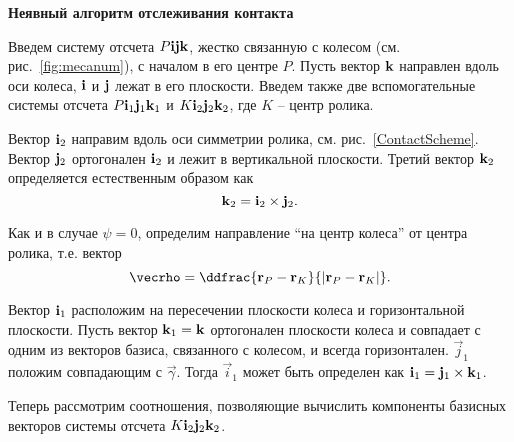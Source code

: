 \textbf{Неявный алгоритм отслеживания контакта}

Введем систему отсчета $P{\bf i}{\bf j}{\bf k}$, жестко связанную с колесом (см. рис.~\ref{fig:mecanum}), с началом в его центре $P$. Пусть вектор ${\bf k}$ направлен вдоль оси колеса, ${\bf i}$ и ${\bf j}$ лежат в его плоскости. Введем также две вспомогательные системы отсчета $P{\bf i}_1{\bf j}_1{\bf k}_1$ и $K{\bf i}_2{\bf j}_2{\bf k}_2$, где $K$ -- центр ролика.

Вектор ${\bf i}_2$ направим вдоль оси симметрии ролика, см. рис.~\ref{ContactScheme}. Вектор ${\bf j}_2$ ортогонален ${\bf i}_2$ и лежит в вертикальной плоскости. Третий вектор ${\bf k}_2$ определяется естественным образом как
$$
{\bf k}_2={\bf i}_2\times {\bf j}_2.
$$



Как и в случае $\psi = 0$, определим направление ``на центр колеса'' от центра ролика, т.е. вектор
$$
    \vecrho = \ddfrac
        { {\bf r}_{P}-{\bf r}_{K} }
        {\left| {\bf r}_{P}-{\bf r}_{K} \right|}.
$$

Вектор ${\bf i}_1$ расположим на пересечении плоскости колеса и горизонтальной плоскости. Пусть вектор ${\bf k}_1 = {\bf k}$ ортогонален плоскости колеса и совпадает с одним из векторов базиса, связанного с колесом, и всегда горизонтален. 
$\vec{j}_1$ положим совпадающим с $\vec{\gamma}$. Тогда $\vec{i}_1$ может быть определен как ${\bf i}_1 = {\bf j}_1 \times {\bf k}_1$.

Теперь рассмотрим соотношения, позволяющие вычислить компоненты базисных векторов системы отсчета $K{\bf i}_2{\bf j}_2{\bf k}_2$.

